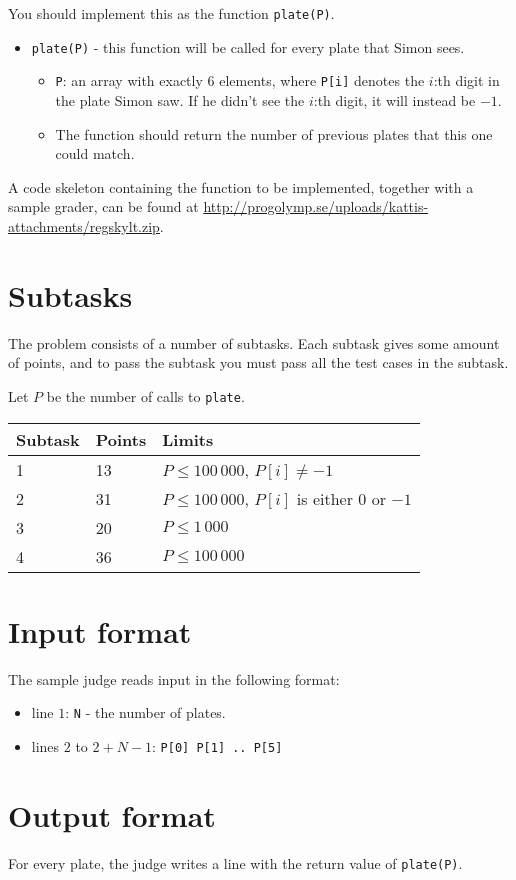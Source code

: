 You should implement this as the function \texttt{plate(P)}.
\begin{itemize}
  \item \texttt{plate(P)} - this function will be called for every plate that Simon sees.
  \begin{itemize}
    \item \texttt{P}: an array with exactly 6 elements, where \texttt{P[i]} denotes the $i$:th digit in the plate Simon saw.
      If he didn't see the $i$:th digit, it will instead be $-1$.
    \item The function should return the number of previous plates that this one could match.
  \end{itemize}
\end{itemize}

A code skeleton containing the function to be implemented, together with a sample grader, can be found at
\url{http://progolymp.se/uploads/kattis-attachments/regskylt.zip}.

\section*{Subtasks}
The problem consists of a number of subtasks. Each subtask gives some amount of points, and to pass
the subtask you must pass all the test cases in the subtask.

Let $P$ be the number of calls to \texttt{plate}.

\begin{tabular}{|l|l|l|}
  \hline
  \textbf{Subtask} & \textbf{Points} & \textbf{Limits} \\ \hline
  1 & 13 & $P \le 100\,000$, $P[i] \not= -1$ \\ \hline
  2 & 31 & $P \le 100\,000$, $P[i]$ is either $0$ or $-1$ \\ \hline
  3 & 20 & $P \le 1\,000$ \\ \hline
  4 & 36 & $P \le 100\,000$ \\ \hline
\end{tabular}

\section*{Input format}
The sample judge reads input in the following format:

\begin{itemize}
  \item line $1$: \texttt{N} - the number of plates.
  \item lines $2$ to $2 + N - 1$: \texttt{P[0] P[1] .. P[5]}
\end{itemize}

\section*{Output format}
For every plate, the judge writes a line with the return value of \texttt{plate(P)}.
